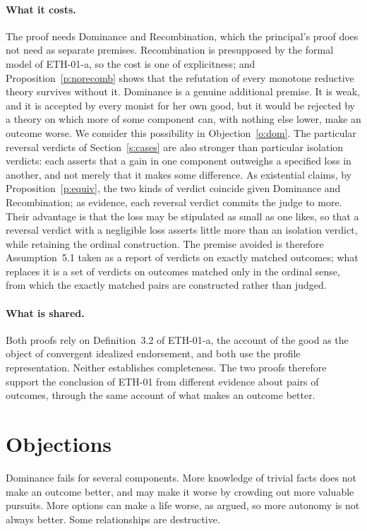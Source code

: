 \documentclass{situationist-preprint}
\begin{document}
\paragraph{What it costs.} The proof needs Dominance and Recombination, which the principal's proof does not need as separate premises. Recombination is presupposed by the formal model of ETH-01-a, so the cost is one of explicitness; and Proposition~\ref{p:norecomb} shows that the refutation of every monotone reductive theory survives without it. Dominance is a genuine additional premise. It is weak, and it is accepted by every monist for her own good, but it would be rejected by a theory on which more of some component can, with nothing else lower, make an outcome worse. We consider this possibility in Objection~\ref{o:dom}. The particular reversal verdicts of Section~\ref{s:cases} are also stronger than particular isolation verdicts: each asserts that a gain in one component outweighs a specified loss in another, and not merely that it makes some difference. As existential claims, by Proposition~\ref{p:equiv}, the two kinds of verdict coincide given Dominance and Recombination; as evidence, each reversal verdict commits the judge to more. Their advantage is that the loss may be stipulated as small as one likes, so that a reversal verdict with a negligible loss asserts little more than an isolation verdict, while retaining the ordinal construction. The premise avoided is therefore Assumption~5.1 taken as a report of verdicts on exactly matched outcomes; what replaces it is a set of verdicts on outcomes matched only in the ordinal sense, from which the exactly matched pairs are constructed rather than judged.

\paragraph{What is shared.} Both proofs rely on Definition~3.2 of ETH-01-a, the account of the good as the object of convergent idealized endorsement, and both use the profile representation. Neither establishes completeness. The two proofs therefore support the conclusion of ETH-01 from different evidence about pairs of outcomes, through the same account of what makes an outcome better.

\section{Objections}\label{s:obj}

\begin{objection}[Dominance]\label{o:dom}
Dominance fails for several components. More knowledge of trivial facts does not make an outcome better, and may make it worse by crowding out more valuable pursuits. More options can make a life worse, as \citet{Dworkin1982} argued, so more autonomy is not always better. Some relationships are destructive.
\end{objection}
\end{document}
